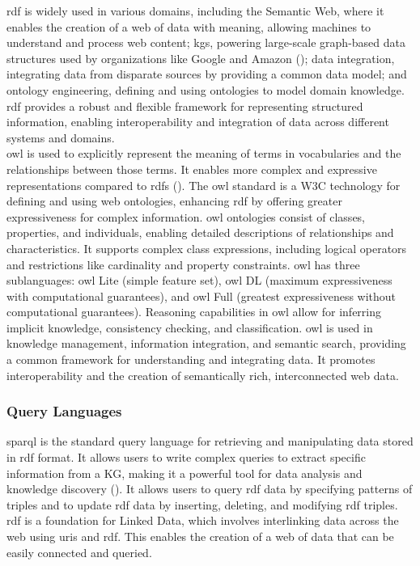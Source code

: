 \gls{rdf} is widely used in various domains, including the Semantic Web, where it enables the creation of a web of data with meaning, allowing machines to understand and process web content; \glspl{kg}, powering large-scale graph-based data structures used by organizations like Google and Amazon (\cite{Kejriwal2022}); data integration, integrating data from disparate sources by providing a common data model; and ontology engineering, defining and using ontologies to model domain knowledge. \gls{rdf} provides a robust and flexible framework for representing structured information, enabling interoperability and integration of data across different systems and domains.
\\\gls{owl} is used to explicitly represent the meaning of terms in vocabularies and the relationships between those terms. It enables more complex and expressive representations compared to \gls{rdfs} (\cite{Deborah2004}).
The \gls{owl} standard is a W3C technology for defining and using web ontologies, enhancing \gls{rdf} by offering greater expressiveness for complex information. \gls{owl} ontologies consist of classes, properties, and individuals, enabling detailed descriptions of relationships and characteristics. It supports complex class expressions, including logical operators and restrictions like cardinality and property constraints.
\gls{owl} has three sublanguages: \gls{owl} Lite (simple feature set), \gls{owl} DL (maximum expressiveness with computational guarantees), and \gls{owl} Full (greatest expressiveness without computational guarantees). Reasoning capabilities in \gls{owl} allow for inferring implicit knowledge, consistency checking, and classification.
\gls{owl} is used in knowledge management, information integration, and semantic search, providing a common framework for understanding and integrating data. It promotes interoperability and the creation of semantically rich, interconnected web data.

\subsubsection*{Query Languages}
\gls{sparql} is the standard query language for retrieving and manipulating data stored in \gls{rdf} format. It allows users to write complex queries to extract specific information from a KG, making it a powerful tool for data analysis and knowledge discovery (\cite{Jorge2009}).
It allows users to query \gls{rdf} data by specifying patterns of triples and to update \gls{rdf} data by inserting, deleting, and modifying \gls{rdf} triples. \gls{rdf} is a foundation for Linked Data, which involves interlinking data across the web using \glspl{uri} and \gls{rdf}. This enables the creation of a web of data that can be easily connected and queried.

